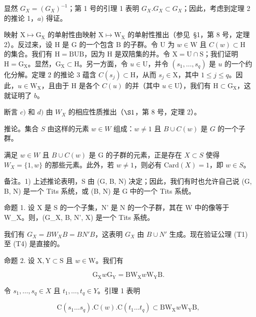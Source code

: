 显然 \(G_{X} = (G_{X})^{-1}\)；第 1 号的引理 1 表明 \(G_{X}.G_{X} \subset G_{X}\)；因此，考虑到定理 2 的推论 1，\(a)\) 得证。

映射 \(\mathrm{X} \mapsto \mathrm{G}_{\mathrm{X}}\) 的单射性由映射 \(\mathrm{X} \mapsto \mathrm{W}_{\mathrm{X}}\) 的单射性推出（参见~§1，第 8 号，定理 2）。反过来，设 \(\mathrm{H}\) 是 \(\mathrm{G}\) 的一个包含 \(\mathrm{B}\) 的子群。令 \(\mathrm{U}\) 为 \(w \in \mathrm{W}\) 且 \(C(w) \subset \mathrm{H}\) 的集合。我们有 \(\mathrm{H} = \mathrm{BUB}\)，因为 \(\mathrm{H}\) 是双陪集的并。令 \(\mathrm{X} = \mathrm{U} \cap \mathrm{S}\)；我们证明 \(\mathrm{H} = \mathrm{G}_{\mathrm{X}}\)。显然，\(\mathrm{G}_{\mathrm{X}} \subset \mathrm{H}\)。另一方面，令 \(u \in \mathrm{U}\)，并令 \((s_1, \ldots, s_q)\) 是 \(u\) 的一个约化分解。定理 2 的推论 3 蕴含 \(C(s_j) \subset \mathrm{H}\)，从而 \(s_j \in \mathrm{X}\)，其中 \(1 \leqslant j \leqslant q\)。因此，\(u \in \mathrm{W}_{\mathrm{X}}\)，且由于 \(\mathrm{H}\) 是各个 \(C(u)\) 的并（其中 \(u \in \mathrm{U}\)），我们有 \(\mathrm{H} \subset \mathrm{G}_{\mathrm{X}}\)，这就证明了 \(b\)。

断言 \(c)\) 和 \(d)\) 由 \(W_X\) 的相应性质推出（\(\S 1\)，第 8 号，定理 2）。

推论。集合 \(S\) 由这样的元素 \(w \in W\) 组成：\(w \neq 1\) 且 \(B \cup C(w)\) 是 \(G\) 的一个子群。

满足 \(w \in W\) 且 \(B \cup C(w)\) 是 G 的子群的元素，正是存在 \(X \subset S\) 使得 \(W_{X} = \{1, w\}\) 的那些元素。此外，若 \(w \neq 1\)，则必有 \(\text{Card}(X) = 1\)，即 \(w \in S\)。

备注。1) 上述推论表明，S 由 (G, B, N) 决定；因此，我们有时也允许自己说 (G, B, N) 是一个 Tits 系统，或 (B, N) 是 G 中的一个 Tits 系统。

命题 1. 设 X 是 S 的一个子集，N' 是 N 的一个子群，其在 W 中的像等于 W\_X。则，(G\_X, B, N', X) 是一个 Tits 系统。

我们有 \(G_{X} = BW_{X}B = BN'B\)，这表明 \(G_{X}\) 由 \(B \cup N'\) 生成。现在验证公理 (T1) 至 (T4) 是直接的。

命题 2. 设 \(\mathrm{X}, \mathrm{Y} \subset \mathrm{S}\) 且 \(w \in \mathrm{W}\)。我们有

\[
\mathrm{G} _ {\mathrm{X}} w \mathrm{G} _ {\mathrm{Y}} = \mathrm{BW} _ {\mathrm{X}} w \mathrm{W} _ {\mathrm{Y}} \mathrm{B}.
\]

令 \(s_1, \ldots, s_q \in X\) 且 \(t_1, \ldots, t_q \in Y\)。引理 1 表明

\[
\mathrm{C} (s _ {1} \dots s _ {q}). \mathrm{C} (w). \mathrm{C} (t _ {1} \dots t _ {q}) \subset \mathrm{BW} _ {\mathrm{X}} w \mathrm{W} _ {\mathrm{Y}} \mathrm{B},
\]

